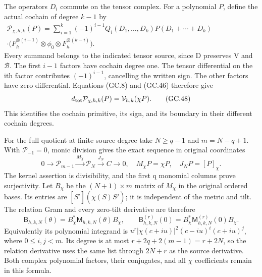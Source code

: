 The operators $D_i$ commute on the tensor complex. For a polynomial
$P$, define the actual cochain of degree $k-1$ by
\[
 \begin{split}
 \mathcal P_{\chi,h,k}(P)=
 \sum_{i=1}^k(-1)^{i-1}Q_i(D_1,\ldots,D_k)
 P(D_1+\cdots+D_k)\quad\quad\quad\quad\quad\quad\quad\\[-4pt]
 \cdot\bigl(F_h^{\otimes(i-1)}\otimes\phi_0
                                \otimes F_h^{\otimes(k-i)}\bigr).
 \end{split}                                                   \tag{GC.47}
\]
Every summand belongs to the indicated tensor source, since D
preserves V and $\mathscr B$. The first $i-1$ factors have cochain
degree one. The tensor differential on the ith factor contributes
$(-1)^{i-1}$, cancelling the written sign. The other factors have
zero differential. Equations (GC.8) and (GC.46) therefore give
\[
 d_{\rm tot}\mathcal P_{\chi,h,k}(P)
       =\mathcal V_{h,k}(\chi P).                             \tag{GC.48}
\]
This identifies the cochain primitive, its sign, and its boundary in
their different cochain degrees.

For the full quotient at finite source degree take $N\ge q-1$ and
$m=N-q+1$. With $\mathcal P_{-1}=0$, monic division gives the
exact sequence in original coordinates
\[
 0\longrightarrow\mathcal P_{m-1}
 \xrightarrow{M_\chi}\mathcal P_N
 \xrightarrow{J_N}C\longrightarrow0,
 \quad M_\chi P=\chi P,\quad J_NP=[P]_\chi.                    \tag{GC.49}
\]
The kernel assertion is divisibility, and the first q monomial
columns prove surjectivity. Let $B_\chi$ be the $(N+1)\times m$
matrix of $M_\chi$ in the original ordered bases. Its entries are
$[S^i](\chi(S)S^j)$; it is independent of the metric and tilt.
The relation Gram and every zero-tilt derivative are therefore
\[
 \mathsf B_{h,k,N}(\theta)=B_\chi^*\mathsf M_{h,k,N}(\theta)B_\chi,
 \qquad
 \mathsf B_{h,k,N}^{(r)}(0)=B_\chi^*\mathsf M_{h,k,N}^{(r)}(0)B_\chi.
                                                               \tag{GC.50}
\]
Equivalently its polynomial integrand is
$u^r|\chi(c+iu)|^2(c-iu)^i(c+iu)^j$, where $0\le i,j<m$.
Its degree is at most $r+2q+2(m-1)=r+2N$, so the relation derivative
uses the same list through $2N+r$ as the source derivative. Both
complex polynomial factors, their conjugates, and all $\chi$ coefficients
remain in this formula.

